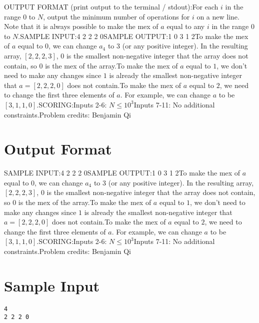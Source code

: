\documentclass[12pt]{article}
\begin{document}
OUTPUT FORMAT (print output to the terminal / stdout):For each $i$ in the range $0$ to $N$, output the minimum number of operations
for $i$ on a new line. Note that it is always possible to make the mex of $a$
equal to any $i$ in the range $0$ to $N$.SAMPLE INPUT:4
2 2 2 0SAMPLE OUTPUT:1
0
3
1
2To make the mex of $a$ equal to $0$, we can change $a_4$ to $3$ (or any
positive integer). In the resulting array, $[2, 2, 2, 3]$, $0$ is the smallest
non-negative integer that the array does not contain, so $0$ is the mex of the
array.To make the mex of $a$ equal to $1$, we don't need to make any changes since
$1$ is already the smallest non-negative integer that $a = [2, 2, 2, 0]$ does
not contain.To make the mex of $a$ equal to $2$, we need to change the first three
elements of $a$. For example, we can change $a$ to be $[3, 1, 1, 0]$.SCORING:Inputs 2-6: $N\le 10^3$Inputs 7-11: No additional constraints.Problem credits: Benjamin Qi

\section*{Output Format}
SAMPLE INPUT:4
2 2 2 0SAMPLE OUTPUT:1
0
3
1
2To make the mex of $a$ equal to $0$, we can change $a_4$ to $3$ (or any
positive integer). In the resulting array, $[2, 2, 2, 3]$, $0$ is the smallest
non-negative integer that the array does not contain, so $0$ is the mex of the
array.To make the mex of $a$ equal to $1$, we don't need to make any changes since
$1$ is already the smallest non-negative integer that $a = [2, 2, 2, 0]$ does
not contain.To make the mex of $a$ equal to $2$, we need to change the first three
elements of $a$. For example, we can change $a$ to be $[3, 1, 1, 0]$.SCORING:Inputs 2-6: $N\le 10^3$Inputs 7-11: No additional constraints.Problem credits: Benjamin Qi

\section*{Sample Input}
\begin{verbatim}
4
2 2 2 0
\end{verbatim}
\end{document}
